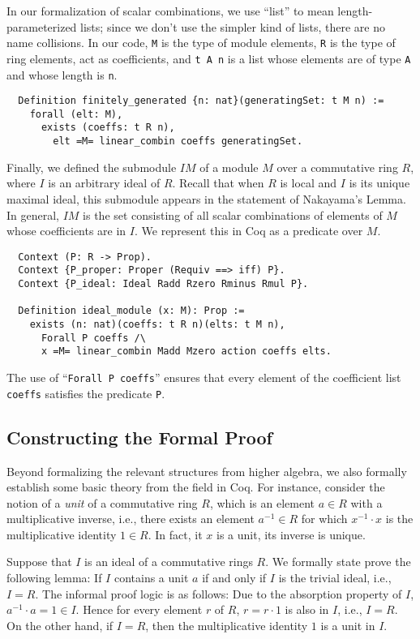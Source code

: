 \documentclass{article}
\begin{document}
In our formalization of scalar combinations, we use  ``list'' to mean
length-parameterized lists; since we don't use the simpler kind of lists, there
are no name collisions. In our code, \texttt{M} is the type of module elements,
\texttt{R} is the type of ring elements, act as coefficients, and
\texttt{t A n} is a list whose elements are of type \texttt{A} and whose length
is \texttt{n}.

\begin{verbatim}
  Definition finitely_generated {n: nat}(generatingSet: t M n) :=
    forall (elt: M),
      exists (coeffs: t R n),
        elt =M= linear_combin coeffs generatingSet.
\end{verbatim}

Finally, we defined the submodule $IM$ of a module $M$ over a commutative ring $R$, 
where $I$ is an arbitrary ideal of $R$.
Recall that when $R$ is local and $I$ is its unique maximal ideal, this submodule 
appears in the statement of Nakayama's Lemma. 
In general, $IM$ is the set consisting of all scalar
combinations of elements of \(M\) whose coefficients are in  \(I\). We
represent this in Coq as a predicate over \(M\).

\begin{verbatim}
  Context (P: R -> Prop).
  Context {P_proper: Proper (Requiv ==> iff) P}.
  Context {P_ideal: Ideal Radd Rzero Rminus Rmul P}.
  
  Definition ideal_module (x: M): Prop :=
    exists (n: nat)(coeffs: t R n)(elts: t M n),
      Forall P coeffs /\
      x =M= linear_combin Madd Mzero action coeffs elts.
\end{verbatim}

\noindent The use of  ``\verb|Forall P coeffs|'' ensures that every element of the
coefficient list \texttt{coeffs} satisfies the predicate \texttt{P}.  

\subsection{Constructing the Formal Proof}
Beyond formalizing the relevant structures from higher algebra, we also
formally establish some basic theory from the field in Coq. For instance, 
consider the notion of a \emph{unit} of a
commutative ring $R$, which is an element $a \in R$ with a multiplicative inverse,
i.e., there exists an element $a^{-1} \in R$ for which $x^{-1} \cdot x$ is the
multiplicative identity $1 \in R$.  In fact, it $x$ is a unit, its inverse is unique.

Suppose that $I$ is an ideal of a commutative rings $R$.  
We formally state prove the following lemma: If $I$ contains a
unit $a$ if and only if $I$ is the trivial ideal, i.e., $I=R$. 
The informal proof logic is as follows:  Due to the absorption property of $I$,  
$a^{-1}  \cdot a= 1 \in I$.  Hence for every element $r$ of $R$,
$r = r \cdot 1$ is also in $I$, i.e., $I=R$. 
On the other hand, if $I = R$, then the multiplicative identity $1$ is a unit in $I$.  
\end{document}
